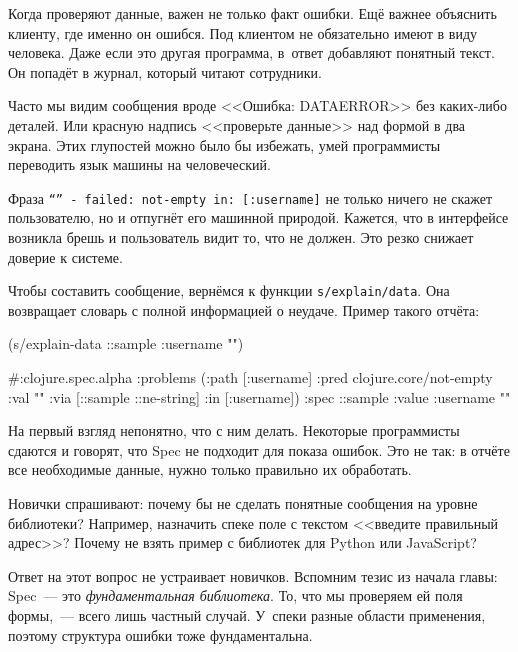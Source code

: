 
\label{spec-messages}

Когда проверяют данные, важен не только факт ошибки. Ещё важнее объяснить
клиенту, где именно он ошибся. Под клиентом не обязательно имеют в виду
человека. Даже если это другая программа, в~ответ добавляют понятный текст. Он
попадёт в журнал, который читают сотрудники.

Часто мы видим сообщения вроде <<Ошибка: DATAERROR>> без каких-либо деталей. Или
красную надпись <<проверьте данные>> над формой в два экрана. Этих глупостей
можно было бы избежать, умей программисты переводить язык машины на человеческий.


Фраза \texttt{``'' - failed: not-empty in: [:user\-name]} не только ничего не скажет
пользователю, но и отпугнёт его машинной природой. Кажется, что в интерфейсе
возникла брешь и пользователь видит то, что не должен. Это резко снижает
доверие к системе.

Чтобы составить сообщение, вернёмся к функции \texttt{s/explain\-/data}. Она
возвращает словарь с полной информацией о неудаче. Пример такого отчёта:

\begin{clojure}
(s/explain-data ::sample {:username ""})

#:clojure.spec.alpha
{:problems
 ({:path [:username]
   :pred clojure.core/not-empty
   :val ""
   :via [::sample ::ne-string]
   :in [:username]})
 :spec ::sample
 :value {:username ""}}
\end{clojure}


На первый взгляд непонятно, что с ним делать. Некоторые программисты сдаются и
говорят, что Spec не подходит для показа ошибок. Это не так: в отчёте все
необходимые данные, нужно только правильно их обработать.

Новички спрашивают: почему бы не сделать понятные сообщения на уровне
библиотеки? Например, назначить спеке поле с текстом <<введите правильный
адрес>>? Почему не взять пример с библиотек для Python или JavaScript?


Ответ на этот вопрос не устраивает новичков. Вспомним тезис из начала главы:
Spec~--- это \emph{фундаментальная библиотека}. То, что мы проверяем ей поля
формы,~--- всего лишь частный случай. У~спеки разные области применения, поэтому
структура ошибки тоже фундаментальна.


